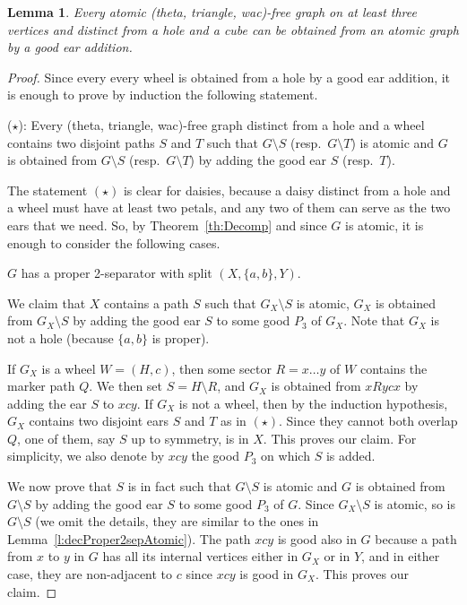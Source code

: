 \documentclass[11pt]{article}
\newtheorem{lemma}[theo]{Lemma}
\newcommand{\sm}{\setminus}
\begin{document}
\begin{lemma}
  \label{l:findOneEar}
  Every atomic (theta, triangle, wac)-free graph on at least three vertices and distinct from a hole and a cube can be obtained from an atomic graph by a good ear addition.
\end{lemma}

\begin{proof}
  Since every  every wheel is obtained from a hole by a good ear addition, it is enough to prove by induction the following statement. 
  
  \medskip
  
  \noindent ($\star$): Every (theta, triangle, wac)-free graph distinct from a hole and a wheel contains two disjoint paths $S$ and $T$ such that $G\sm S$ (resp.\ $G\sm T$) is atomic and $G$ is obtained from $G\sm S$ (resp.\ $G\sm T$) by adding the good ear $S$ (resp.~$T$).
  
  \medskip
  
  The statement $(\star)$ is clear for daisies, because a daisy distinct from a hole and a wheel must have at least two petals, and any two of them can serve as the two ears that we need. 
  So, by Theorem~\ref{th:Decomp} and since $G$ is atomic, it is enough to consider the following cases. 
  
  \medskip
  
   $G$ has a proper 2-separator with split $(X, \{a, b\}, Y)$.

  We claim that $X$ contains a path $S$ such that $G_X \sm S$ is atomic, $G_X$ is obtained from $G_X \sm S$ by adding the good ear $S$ to some good $P_3$ of $G_X$. Note that $G_X$ is not a hole (because $\{a, b\}$ is proper). 
  
  If $G_X$ is a wheel $W = (H, c)$, then some sector $R = x \dots y$ of $W$ contains the marker path $Q$. 
  We then set $S = H\sm R$, and $G_X$ is obtained from $xRycx$ by adding the ear $S$ to $xcy$. 
  If $G_X$ is not a wheel, then by the induction hypothesis, $G_X$ contains two disjoint ears $S$ and $T$ as in $(\star)$.  
  Since they cannot both overlap $Q$, one of them, say $S$ up to symmetry, is in $X$. This proves our claim.  For simplicity, we also denote by $xcy$ the good $P_3$ on which $S$ is added. 
  
  We now prove that $S$ is in fact such that  $G\sm S$ is atomic and $G$ is obtained from $G\sm S$ by adding the good ear $S$ to some good $P_3$ of $G$.  Since $G_X \sm S$ is atomic, so is $G\sm S$ (we omit the details, they are similar to the ones in Lemma~\ref{l:decProper2sepAtomic}). The path $xcy$ is good also in $G$ because a path from $x$ to $y$ in $G$ has all its internal vertices either in $G_X$ or in $Y$, and in either case, they are non-adjacent to $c$ since $xcy$ is good in $G_X$.  This proves our claim. 
  

\end{proof}
\end{document}
